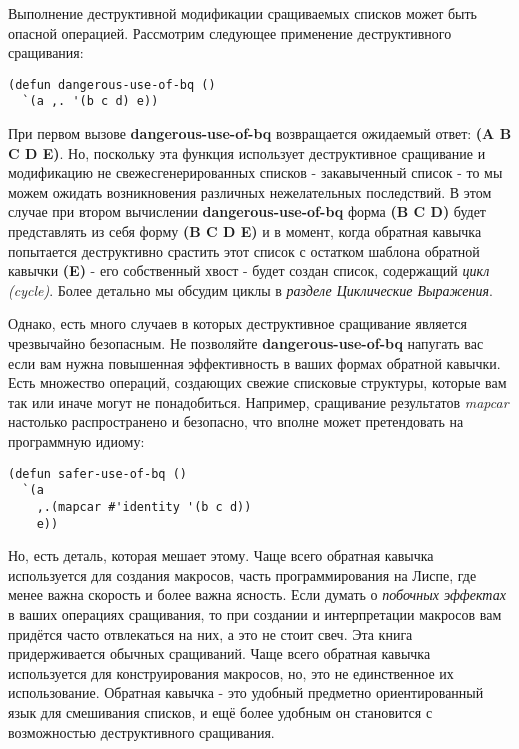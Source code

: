 Выполнение де\-струк\-тив\-ной модификации сращиваемых списков может быть опасной операцией. Рассмотрим следующее применение деструктивного сращивания:

\begin{verbatim}
(defun dangerous-use-of-bq ()
  `(a ,. '(b c d) e))
\end{verbatim}

При первом вызове \textbf{dangerous-use-of-bq} возвращается ожидаемый ответ: \textbf{(A B C D E)}. Но, поскольку эта функция использует деструктивное сращивание и модификацию не свежесгенерированных списков - закавыченный список - то мы можем ожидать возникновения различных нежелательных последствий. В этом случае при втором вычислении \textbf{dangerous-use-of-bq} форма \textbf{(B C D)} будет представлять из себя форму \textbf{(B C D E)} и в момент, когда обратная кавычка попытается деструктивно срастить этот список с остатком шаблона обратной кавычки \textbf{(E)} - его собственный хвост - будет создан список, содержащий \emph{цикл (cycle)}. Более детально мы обсудим циклы в \emph{разделе Циклические Выражения}.

Однако, есть много случаев в которых деструктивное сращивание является чрезвычайно безопасным. Не позволяйте \textbf{dangerous-use-of-bq} напугать вас если вам нужна повышенная эффективность в ваших формах обратной кавычки. Есть множество операций, создающих свежие списковые структуры, которые вам так или иначе могут не понадобиться. Например, сращивание результатов \emph{mapcar} настолько распространено и безопасно, что вполне может претендовать на программную идиому:

\begin{verbatim}
(defun safer-use-of-bq ()
  `(a
    ,.(mapcar #'identity '(b c d))
    e))
\end{verbatim}

Но, есть деталь, которая мешает этому. Чаще всего обратная кавычка используется для создания макросов, часть программирования на Лиспе, где менее важна скорость и более важна ясность. Если думать о \emph{побочных эффектах} в ваших операциях сращивания, то при создании и интерпретации макросов вам придётся часто отвлекаться на них, а это не стоит свеч. Эта книга придерживается обычных сращиваний. Чаще всего обратная кавычка используется для конструирования макросов, но, это не единственное их использование. Обратная кавычка - это удобный предметно ориентированный язык для смешивания списков, и ещё более удобным он становится с возможностью деструктивного сращивания.

